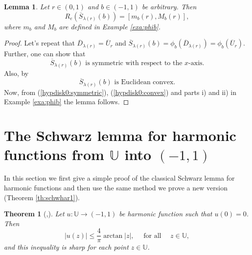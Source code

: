 \documentclass{amsart}
\newtheorem{theorem}{Theorem}
\newtheorem{lemma}{Lemma}
\begin{document}
\begin{lemma}\label{lem:hypdisk0}
Let $r\in(0,1)$ and $b\in(-1,1)$ be arbitrary. Then
\begin{equation*}
    R_{e}(\overline{S}_{\lambda(r)}(b))=[m_b(r),M_b(r)],
\end{equation*}
where $m_b$ and $M_b$ are defined in Example \ref{exa:phib}.
\end{lemma}

\begin{proof}
Let's repeat that $\overline{D}_{\lambda(r)}=\overline{U}_r$ and $\overline{S}_{\lambda(r)}(b)=\phi_{b}(\overline{D}_{\lambda(r)})=\phi_{b}(\overline{U}_{r})$. Further, one can show that
\begin{equation}\label{hypdisk0:symmetric}
    \overline{S}_{\lambda(r)}(b) \mbox{ is symmetric with respect to the $x$-axis}.
\end{equation}
Also, by  \cite[Theorem 7.11]{BeardonMinda}
\begin{equation}\label{hypdisk0:convex}
    \overline{S}_{\lambda(r)}(b) \mbox{ is Euclidean convex}.
\end{equation}
Now, from (\ref{hypdisk0:symmetric}), (\ref{hypdisk0:convex}) and parts i) and ii) in Example \ref{exa:phib} the lemma follows.
\end{proof}



\section{The Schwarz lemma for harmonic functions from $\mathbb{U}$ into $(-1,1)$}

In this section we first give a simple proof of the classical Schwarz lemma
for harmonic functions and then use the same method we prove a new version (Theorem \ref{th:schwhar1}).

\begin{theorem}[\cite{heinz},{\cite[p. 77]{duren}}]\label{th:schwhar}
Let $u:\mathbb{U}\rightarrow(-1,1)$ be harmonic function such that $u(0)=0$. Then
\begin{equation}\label{schwhar:fla1}
    |u(z)|\leqslant\frac{4}{\pi}\arctan{|z|}, \quad \mbox{ for all } \quad z\in\mathbb{U},
\end{equation}
and this inequality is sharp for each point $z\in\mathbb{U}$.
\end{theorem}
\end{document}
